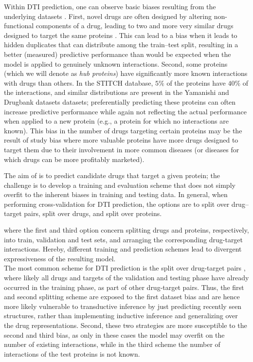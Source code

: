\documentclass{bioinfo}
\renewcommand{\cite}{\citep}
\begin{document}
Within DTI prediction, one can observe basic biases resulting from the
underlying datasets \citep{Pahikkala2014}. First, novel drugs are
often designed by altering non-functional components of a drug,
leading to two and more very similar drugs designed to target the same
proteins \cite{Overington2006}. This can lead to a bias when it leads
to \glqq hidden duplicates\grqq{} that can distribute among the
train--test split, resulting in a better (measured) predictive
performance than would be expected when the model is applied to
genuinely unknown interactions. Second, some proteins (which we will
denote as \textit{hub proteins}) have significantly more known
interactions with drugs than others. In the STITCH database, $5\%$
of the proteins have $40\%$ of the interactions, and similar
distributions are present in the Yamanishi and Drugbank datasets
\cite{Drugbank2007, Drugbank2017} datasets; preferentially predicting
these proteins can often increase predictive performance while again
not reflecting the actual performance when applied to a new protein
(e.g., a protein for which no interactions are known). This bias in
the number of drugs targeting certain proteins may be the result of
study bias where more \glqq valuable\grqq{} proteins have more drugs
designed to target them due to their involvement in more common
diseases (or diseases for which drugs can be more profitably
marketed).

The aim of \name is to predict candidate drugs that target a given
protein; the challenge is to develop a training and evaluation scheme
that does not simply overfit to the inherent biases in training and
testing data.
In general, when performing cross-validation for DTI prediction, the
options are to split over drug--target pairs, split over drugs, and
split over proteins.

where the first and third option concern splitting drugs and proteins, respectively, into train, validation and test sets, and arranging the corresponding drug-target interactions. Hereby, different training and prediction schemes lead to divergent expressiveness of the resulting model. \\
The most common scheme for DTI prediction is the split over drug-target pairs \citep{Survey2018}, where likely all drugs and targets of the validation and testing phase have already occurred in the training phase, as part of other drug-target pairs. Thus, the first and second splitting scheme are exposed to the first dataset bias and are hence more likely vulnerable to transductive inference by just predicting recently seen structures, rather than implementing inductive inference and generalizing over the drug representations. Second, these two strategies are more susceptible to the second and third bias, as only in these cases the model may overfit on the number of existing interactions, while in the third scheme the number of interactions of the test proteins is not known. \\
\end{document}
